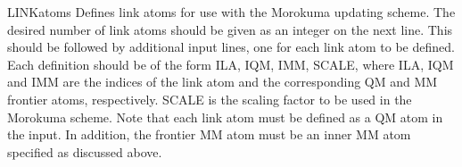 \begin{keywordlist}
\item[LINKatoms]
Defines link atoms for use with the Morokuma updating scheme. The desired number of link atoms should be given as an integer on the next line. This should be followed by additional input lines, one for each link atom to be defined. Each definition should be of the form ILA, IQM, IMM, SCALE, where ILA, IQM and IMM are the  indices of the link atom and the corresponding QM and MM frontier atoms, respectively. SCALE is the scaling factor to be used in the Morokuma scheme. Note that each link atom must be defined as a QM atom in the  input. In addition, the frontier MM atom must be an inner MM atom specified as discussed above.

\end{keywordlist}
